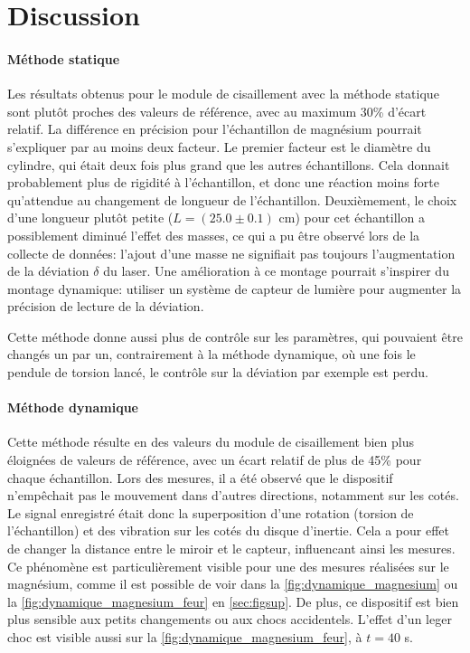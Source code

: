 \section{Discussion}

\paragraph{Méthode statique}
Les résultats obtenus pour le module de cisaillement avec la méthode statique sont plutôt proches des valeurs de référence, avec au maximum 30\% d'écart relatif. La différence en précision pour l'échantillon de magnésium pourrait s'expliquer par au moins deux facteur. Le premier facteur est le diamètre du cylindre, qui était deux fois plus grand que les autres échantillons. Cela donnait probablement plus de rigidité à l'échantillon, et donc une réaction moins forte qu'attendue au changement de longueur de l'échantillon. Deuxièmement, le choix d'une longueur plutôt petite ($L=(25.0\pm0.1)$ \si{\centi\meter}) pour cet échantillon a possiblement diminué l'effet des masses, ce qui a pu être observé lors de la collecte de données: l'ajout d'une masse ne signifiait pas toujours l'augmentation de la déviation $\delta$ du laser. Une amélioration à ce montage pourrait s'inspirer du montage dynamique: utiliser un système de capteur de lumière pour augmenter la précision de lecture de la déviation.

Cette méthode donne aussi plus de contrôle sur les paramètres, qui pouvaient être changés un par un, contrairement à la méthode dynamique, où une fois le pendule de torsion lancé, le contrôle sur la déviation par exemple est perdu.

\paragraph{Méthode dynamique}
Cette méthode résulte en des valeurs du module de cisaillement bien plus éloignées de valeurs de référence, avec un écart relatif de plus de 45\% pour chaque échantillon. Lors des mesures, il a été observé que le dispositif n'empêchait pas le mouvement dans d'autres directions, notamment sur les cotés. Le signal enregistré était donc la superposition d'une rotation (torsion de l'échantillon) et des vibration sur les cotés du disque d'inertie. Cela a pour effet de changer la distance entre le miroir et le capteur, influencant ainsi les mesures. Ce phénomène est particulièrement visible pour une des mesures réalisées sur le magnésium, comme il est possible de voir dans la \autoref{fig:dynamique_magnesium} ou la \autoref{fig:dynamique_magnesium_feur} en \autoref{sec:figsup}. De plus, ce dispositif est bien plus sensible aux petits changements ou aux chocs accidentels. L'effet d'un leger choc est visible aussi sur la \autoref{fig:dynamique_magnesium_feur}, à $t=40$ \si{\second}.

